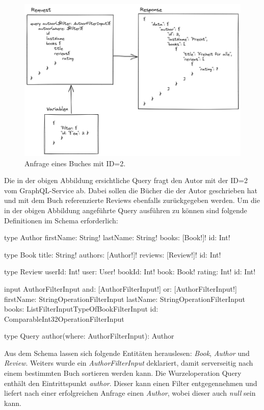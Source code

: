\begin{figure}[H]
    \includegraphics[width=\textwidth]{pics/query_book_with_result.png}
    \caption{Anfrage eines Buches mit ID=2.}
\end{figure}

Die in der obigen Abbildung ersichtliche Query fragt den Autor mit der ID=2 vom GraphQL-Service ab.
Dabei sollen die Bücher die der Autor geschrieben hat und mit dem Buch referenzierte Reviews ebenfalls zurückgegeben werden.
Um die in der obigen Abbildung angeführte Query ausführen zu können sind folgende Definitionen im Schema erforderlich:

\begin{JsCode}
type Author {
    firstName: String!
    lastName: String!
    books: [Book!]!
    id: Int!
}

type Book {
    title: String!
    authors: [Author!]!
    reviews: [Review!]!
    id: Int!
}

type Review {
    userId: Int!
    user: User!
    bookId: Int!
    book: Book!
    rating: Int!
    id: Int!
}

input AuthorFilterInput {
    and: [AuthorFilterInput!]
    or: [AuthorFilterInput!]
    firstName: StringOperationFilterInput
    lastName: StringOperationFilterInput
    books: ListFilterInputTypeOfBookFilterInput
    id: ComparableInt32OperationFilterInput
}

type Query {
    author(where: AuthorFilterInput): Author
}
\end{JsCode}

Aus dem Schema lassen sich folgende Entitäten herauslesen: \textit{Book}, \textit{Author} und \textit{Review}.
Weiters wurde ein \textit{AuthorFilterInput} deklariert, damit serverseitig nach einem bestimmten Buch sortieren werden kann.
Die Wurzeloperation Query enthält den Eintrittspunkt \textit{author}.
Dieser kann einen Filter entgegennehmen und liefert nach einer erfolgreichen Anfrage einen \textit{Author}, wobei dieser auch \textit{null} sein kann.

